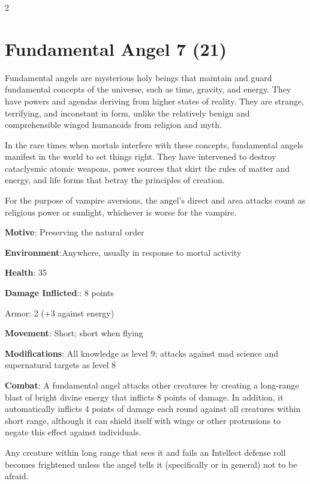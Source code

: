 \begin{multicols}{2}
\section{Fundamental Angel 7 (21)}

Fundamental angels are mysterious holy beings that maintain and guard fundamental concepts of the universe, such as time, gravity, and energy. They have powers and agendas deriving from higher states of reality. They are strange, terrifying, and inconstant in form, unlike the relatively benign and comprehensible winged humanoids from religion and myth.

In the rare times when mortals interfere with these concepts, fundamental angels manifest in the world to set things right. They have intervened to destroy cataclysmic atomic weapons, power sources that skirt the rules of matter and energy, and life forms that betray the principles of creation.

For the purpose of vampire aversions, the angel’s direct and area attacks count as religious power or sunlight, whichever is worse for the vampire.

\textbf{Motive}: Preserving the natural order

\textbf{Environment}:Anywhere, usually in response to mortal activity

\textbf{Health}: 35

\textbf{Damage Inflicted}:: 8 points

Armor: 2 (+3 against energy)

\textbf{Movement}: Short; short when flying

\textbf{Modifications}: All knowledge as level 9; attacks against mad science and supernatural targets as level 8

\textbf{Combat}: A fundamental angel attacks other creatures by creating a long-range blast of
bright divine energy that inflicts 8 points of damage. In addition, it automatically inflicts 4 points of damage each round against all creatures within short range, although it can shield itself with wings or other protrusions to negate this effect against individuals.

Any creature within long range that sees it and fails an Intellect defense roll becomes frightened unless the angel tells it (specifically or in general) not to be afraid.


\end{multicols}
